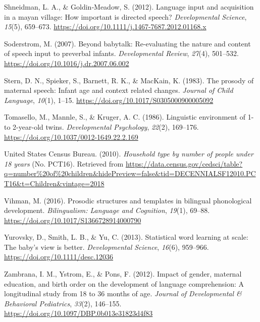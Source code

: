 \documentclass[
  english,
  man,floatsintext]{apa6}
\newlength{\cslhangindent}
\newenvironment{CSLReferences}[2] %
 {%
  \setlength{\parindent}{0pt}
  \ifodd #1 \everypar{\setlength{\hangindent}{\cslhangindent}}\ignorespaces\fi
  \ifnum #2 > 0
  \setlength{\parskip}{#2\baselineskip}
  \fi
 }%
 {}
\begin{document}
\begin{CSLReferences}{1}{0}
\leavevmode{}%
Shneidman, L. A., \& Goldin‐Meadow, S. (2012). Language input and acquisition in a mayan village: How important is directed speech? \emph{Developmental Science}, \emph{15}(5), 659--673. \url{https://doi.org/10.1111/j.1467-7687.2012.01168.x}

\leavevmode{}%
Soderstrom, M. (2007). Beyond babytalk: Re-evaluating the nature and content of speech input to preverbal infants. \emph{Developmental Review}, \emph{27}(4), 501--532. \url{https://doi.org/10.1016/j.dr.2007.06.002}

\leavevmode{}%
Stern, D. N., Spieker, S., Barnett, R. K., \& MacKain, K. (1983). The prosody of maternal speech: Infant age and context related changes. \emph{Journal of Child Language}, \emph{10}(1), 1--15. \url{https://doi.org/10.1017/S0305000900005092}

\leavevmode{}%
Tomasello, M., Mannle, S., \& Kruger, A. C. (1986). Linguistic environment of 1- to 2-year-old twins. \emph{Developmental Psychology}, \emph{22}(2), 169--176. \url{https://doi.org/10.1037/0012-1649.22.2.169}

\leavevmode{}%
United States Census Bureau. (2010). \emph{Household type by number of people under 18 years} (No. {PCT}16). Retrieved from \url{https://data.census.gov/cedsci/table?q=number\%20of\%20children\&hidePreview=false\&tid=DECENNIALSF12010.PCT16\&t=Children\&vintage=2018}

\leavevmode{}%
Vihman, M. (2016). Prosodic structures and templates in bilingual phonological development. \emph{Bilingualism: Language and Cognition}, \emph{19}(1), 69--88. \url{https://doi.org/10.1017/S1366728914000790}

\leavevmode{}%
Yurovsky, D., Smith, L. B., \& Yu, C. (2013). Statistical word learning at scale: The baby's view is better. \emph{Developmental Science}, \emph{16}(6), 959--966. \url{https://doi.org/10.1111/desc.12036}

\leavevmode{}%
Zambrana, I. M., Ystrom, E., \& Pons, F. (2012). Impact of gender, maternal education, and birth order on the development of language comprehension: A longitudinal study from 18 to 36 months of age. \emph{Journal of Developmental \& Behavioral Pediatrics}, \emph{33}(2), 146--155. \url{https://doi.org/10.1097/DBP.0b013e31823d4f83}

\end{CSLReferences}

\endgroup
\end{document}
